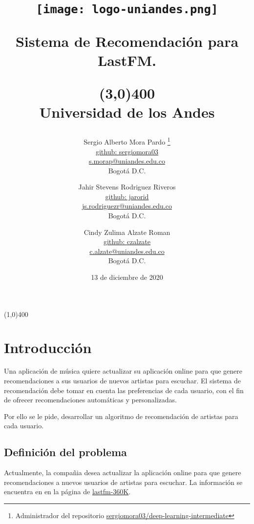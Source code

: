 \documentclass{article}
\title{%
\begin{minipage}{0.3\textwidth}
    \texttt{[image: logo-uniandes.png]}
\end{minipage}%
    \hfill
\begin{minipage}{0.6\textwidth}
    Sistema de Recomendación para \textbf{LastFM}.
\end{minipage}
\line(3,0){400}\\
\textbf{Universidad de los Andes}
}
\author{
Sergio Alberto Mora Pardo \thanks{Administrador del repositorio \href{https://github.com/sergiomora03/deep-learning-intermediate}{sergiomora03/deep-learning-intermediate}}\\
\small{\href{https://github.com/sergiomora03}{github: sergiomora03}}\\
\small \href{mailto:s.morap@uniandes.edu.co}{s.morap@uniandes.edu.co}\\
\small Bogotá D.C.\\
\and
Jahir Stevens Rodriguez Riveros\\
\small{\href{https://github.com/jarorid}{github: jarorid}}\\
\small \href{mailto:js.rodriguezr@uniandes.edu.co}{js.rodriguezr@uniandes.edu.co}\\
\small Bogotá D.C.\\
\and
Cindy Zulima Alzate Roman\\
\small{\href{https://github.com/czalzate}{github: czalzate}}\\
\small \href{mailto:c.alzate@uniandes.edu.co}{c.alzate@uniandes.edu.co}\\
\small Bogotá D.C.\\
}
\begin{document}
\date{13 de diciembre de 2020}
\maketitle
\line(1,0){400}\\




\section{Introducción}

Una aplicación de música quiere actualizar su aplicación online para que genere recomendaciones a sus usuarios de nuevos artistas para escuchar. El sistema de recomendación debe tomar en cuenta las preferencias de cada usuario, con el fin de ofrecer recomendaciones automáticas y personalizadas.

Por ello se le pide, desarrollar un algoritmo de recomendación de artistas para cada usuario.


\subsection{Definición del problema}

Actualmente, la compañia desea actualizar la aplicación online para que genere recomendaciones a nuevos usuarios de artistas para escuchar. La información se encuentra en \cite{CelmaSpringer2010} en la página de \href{http://ocelma.net/MusicRecommendationDataset/lastfm-360K.html}{lastfm-360K}.
\end{document}
